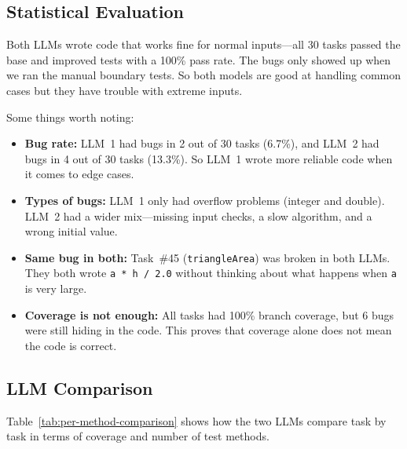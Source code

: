 \documentclass[12pt, a4paper]{article}
\begin{document}
\subsection{Statistical Evaluation}

Both LLMs wrote code that works fine for normal inputs---all 30 tasks passed the base and improved tests with a 100\% pass rate. The bugs only showed up when we ran the manual boundary tests. So both models are good at handling common cases but they have trouble with extreme inputs.

Some things worth noting:
\begin{itemize}
    \item \textbf{Bug rate:} LLM~1 had bugs in 2 out of 30 tasks (6.7\%), and LLM~2 had bugs in 4 out of 30 tasks (13.3\%). So LLM~1 wrote more reliable code when it comes to edge cases.
    \item \textbf{Types of bugs:} LLM~1 only had overflow problems (integer and double). LLM~2 had a wider mix---missing input checks, a slow algorithm, and a wrong initial value.
    \item \textbf{Same bug in both:} Task~\#45 (\texttt{triangleArea}) was broken in both LLMs. They both wrote \texttt{a * h / 2.0} without thinking about what happens when \texttt{a} is very large.
    \item \textbf{Coverage is not enough:} All tasks had 100\% branch coverage, but 6 bugs were still hiding in the code. This proves that coverage alone does not mean the code is correct.
\end{itemize}

\subsection{LLM Comparison}

Table~\ref{tab:per-method-comparison} shows how the two LLMs compare task by task in terms of coverage and number of test methods.
\end{document}

